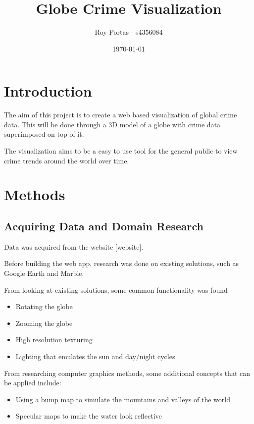 \documentclass[]{article}
\begin{document}
\title{Globe Crime Visualization}
\author{Roy Portas - s4356084}
\date{\today}
\maketitle 

\section{Introduction}

The aim of this project is to create a web based visualization of global crime data.
This will be done through a 3D model of a globe with crime data superimposed on top of it.

The visualization aims to be a easy to use tool for the general public to view crime trends around the world over time.

\section{Methods}

\subsection{Acquiring Data and Domain Research}

Data was acquired from the website [website].

Before building the web app, research was done on existing solutions, such as Google Earth\cite{} and Marble\cite{}.

From looking at existing solutions, some common functionality was found

\begin{itemize}
	\item Rotating the globe
	\item Zooming the globe
	\item High resolution texturing
	\item Lighting that emulates the sun and day/night cycles
\end{itemize}

From researching computer graphics methods, some additional concepts that can be applied include:

\begin{itemize}
	\item Using a bump map to simulate the mountains and valleys of the world
	\item Specular maps to make the water look reflective
\end{itemize}
\end{document}
